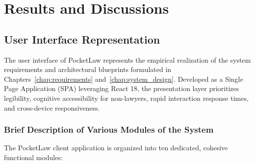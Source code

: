 \chapter{Results and Discussions}
\label{chap:results_discussion}

\section{User Interface Representation}
\label{sec:ui_representation}

The user interface of PocketLaw represents the empirical realization of the system requirements and architectural blueprints formulated in Chapters~\ref{chap:requirements} and~\ref{chap:system_design}. Developed as a Single Page Application (SPA) leveraging React 18, the presentation layer prioritizes legibility, cognitive accessibility for non-lawyers, rapid interaction response times, and cross-device responsiveness.

\subsection{Brief Description of Various Modules of the System}
\label{subsec:module_descriptions}

The PocketLaw client application is organized into ten dedicated, cohesive functional modules:

